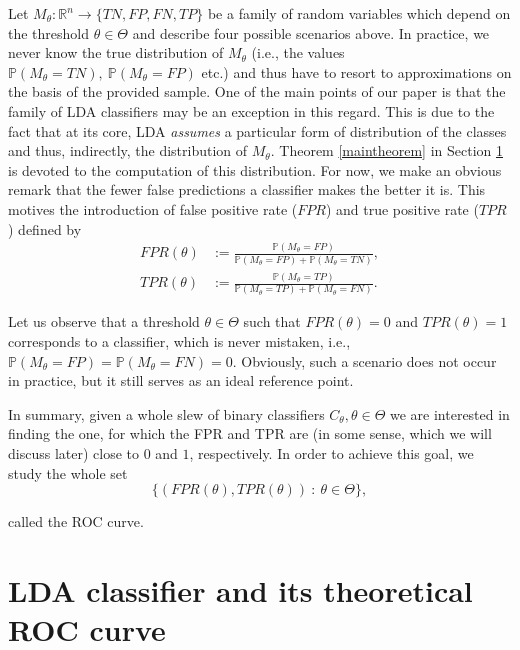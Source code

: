 \documentclass[10pt]{article}
\newcommand{\reals}{\mathbb{R}}
\newcommand{\Prob}{\mathbb{P}}
\begin{document}
\noindent
Let $M_{\theta}:\reals^n\longrightarrow \{TN, FP, FN, TP\}$ be a family of random variables which depend on the threshold $\theta\in\Theta$ and describe four possible scenarios above. In practice, we never know the true distribution of $M_{\theta}$ (i.e., the values $\Prob(M_{\theta} =  TN),\ \Prob(M_{\theta} = FP)$ etc.) and thus have to resort to approximations on the basis of the provided sample. One of the main points of our paper is that the family of LDA classifiers may be an exception in this regard. This is due to the fact that at its core, LDA \textit{assumes} a particular form of distribution of the classes and thus, indirectly, the distribution of $M_{\theta}.$ Theorem \ref{maintheorem} in Section \ref{section:ROC} is devoted to the computation of this distribution. For now, we make an obvious remark that the fewer false predictions a classifier makes the better it is. This motives the introduction of false positive rate ($FPR$) and true positive rate ($TPR$) defined by  
\begin{equation}
\begin{split}
FPR(\theta) &:= \frac{\Prob(M_{\theta} = FP)}{\Prob(M_{\theta} = FP) + \Prob(M_{\theta} = TN)},\\
TPR(\theta) &:= \frac{\Prob(M_{\theta} = TP)}{\Prob(M_{\theta} = TP) + \Prob(M_{\theta} = FN)}.
\end{split}
\label{fprtpr}
\end{equation}

\noindent
Let us observe that a threshold $\theta\in\Theta$ such that $FPR(\theta) = 0$ and $TPR(\theta) = 1$ corresponds to a classifier, which is never mistaken, i.e., $\Prob(M_{\theta} = FP) = \Prob(M_{\theta} = FN) = 0.$ Obviously, such a scenario does not occur in practice, but it still serves as an ideal reference point. 

In summary, given a whole slew of binary classifiers $C_{\theta}, \theta\in\Theta$ we are interested in finding the one, for which the FPR and TPR are (in some sense, which we will discuss later) close to $0$ and $1$, respectively. In order to achieve this goal, we study the whole set 
$$\{(FPR(\theta), TPR(\theta)) \ :\ \theta \in \Theta\},$$ 

\noindent
called the ROC curve. 

\section{LDA classifier and its theoretical ROC curve}
\label{section:ROC}
\end{document}
